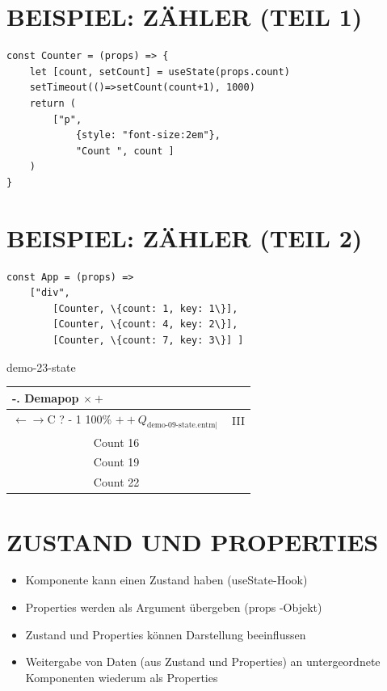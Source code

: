 \section*{BEISPIEL: ZÄHLER (TEIL 1)}
\begin{verbatim}
const Counter = (props) => {
    let [count, setCount] = useState(props.count)
    setTimeout(()=>setCount(count+1), 1000)
    return (
        ["p",
            {style: "font-size:2em"},
            "Count ", count ]
    )
}
\end{verbatim}

\section*{BEISPIEL: ZÄHLER (TEIL 2)}
\begin{verbatim}
const App = (props) =>
    ["div",
        [Counter, \{count: 1, key: 1\}],
        [Counter, \{count: 4, key: 2\}],
        [Counter, \{count: 7, key: 3\}] ]
\end{verbatim}

demo-23-state

\begin{center}
\begin{tabular}{|c|c|}
\hline
\multicolumn{2}{|l|}{-. Demapop $\times+$} \\
\hline
$\leftarrow \rightarrow \mathrm{C}$ ? - 1 100\% $++Q_{\text {demo-09-state.entm| }}$ & III  \\
\hline
Count 16 &  \\
\hline
Count 19 &  \\
\hline
Count 22 &  \\
\hline
\end{tabular}
\end{center}

\section*{ZUSTAND UND PROPERTIES}
\begin{itemize}
  \item Komponente kann einen Zustand haben (useState-Hook)
  \item Properties werden als Argument übergeben (props -Objekt)
  \item Zustand und Properties können Darstellung beeinflussen
  \item Weitergabe von Daten (aus Zustand und Properties) an untergeordnete Komponenten wiederum als Properties
\end{itemize}

